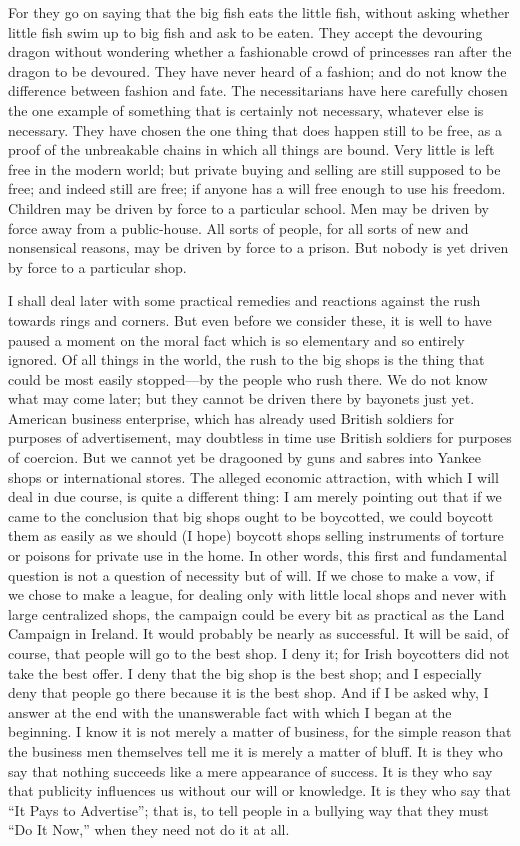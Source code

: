 \documentclass{book}
\begin{document}
For they go on saying that the big fish eats the little fish, without asking whether little fish swim up to big fish and ask to be eaten. They accept the devouring dragon without wondering whether a fashionable crowd of princesses ran after the dragon to be devoured. They have never heard of a fashion; and do not know the difference between fashion and fate. The necessitarians have here carefully chosen the one example of something that is certainly not necessary, whatever else is necessary. They have chosen the one thing that does happen still to be free, as a proof of the unbreakable chains in which all things are bound. Very little is left free in the modern world; but private buying and selling are still supposed to be free; and indeed still are free; if anyone has a will free enough to use his freedom. Children may be driven by force to a particular school. Men may be driven by force away from a public-house. All sorts of people, for all sorts of new and nonsensical reasons, may be driven by force to a prison. But nobody is yet driven by force to a particular shop.

I shall deal later with some practical remedies and reactions against the rush towards rings and corners. But even before we consider these, it is well to have paused a moment on the moral fact which is so elementary and so entirely ignored. Of all things in the world, the rush to the big shops is the thing that could be most easily stopped—by the people who rush there. We do not know what may come later; but they cannot be driven there by bayonets just yet. American business enterprise, which has already used British soldiers for purposes of advertisement, may doubtless in time use British soldiers for purposes of coercion. But we cannot yet be dragooned by guns and sabres into Yankee shops or international stores. The alleged economic attraction, with which I will deal in due course, is quite a different thing: I am merely pointing out that if we came to the conclusion that big shops ought to be boycotted, we could boycott them as easily as we should (I hope) boycott shops selling instruments of torture or poisons for private use in the home. In other words, this first and fundamental question is not a question of necessity but of will. If we chose to make a vow, if we chose to make a league, for dealing only with little local shops and never with large centralized shops, the campaign could be every bit as practical as the Land Campaign in Ireland. It would probably be nearly as successful. It will be said, of course, that people will go to the best shop. I deny it; for Irish boycotters did not take the best offer. I deny that the big shop is the best shop; and I especially deny that people go there because it is the best shop. And if I be asked why, I answer at the end with the unanswerable fact with which I began at the beginning. I know it is not merely a matter of business, for the simple reason that the business men themselves tell me it is merely a matter of bluff. It is they who say that nothing succeeds like a mere appearance of success. It is they who say that publicity influences us without our will or knowledge. It is they who say that “It Pays to Advertise”; that is, to tell people in a bullying way that they must “Do It Now,” when they need not do it at all.
\end{document}
